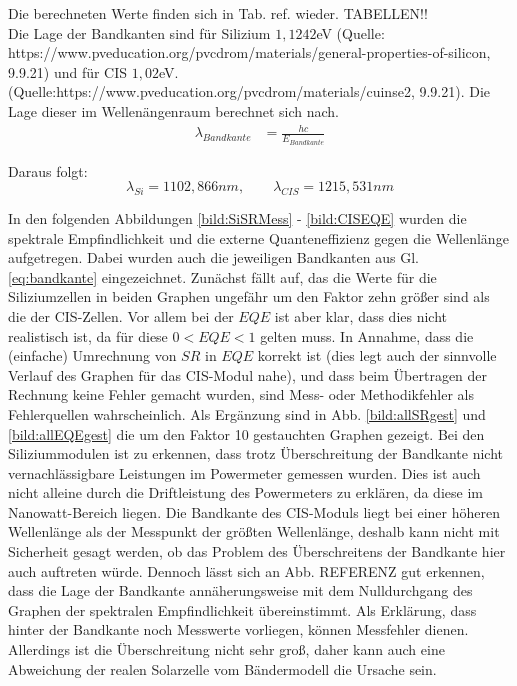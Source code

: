 Die berechneten Werte finden sich in Tab. ref. wieder. TABELLEN!!
\\

Die Lage der Bandkanten sind für Silizium $1,1242$eV (Quelle: https://www.pveducation.org/pvcdrom/materials/general-properties-of-silicon, 9.9.21) und für CIS $1,02$eV. (Quelle:https://www.pveducation.org/pvcdrom/materials/cuinse2, 9.9.21). Die Lage dieser im Wellenängenraum berechnet sich nach. \\

\begin{align}
\lambda_{Bandkante} &= \frac{hc}{E_{Bandkante}}
\end{align}

Daraus folgt: \\

\begin{equation}
\lambda_{Si} = 1102,866 nm, \qquad \lambda_{CIS} = 1215,531 nm
\label{eq:bandkante}
\end{equation}

In den folgenden Abbildungen \ref{bild:SiSRMess} - \ref{bild:CISEQE} wurden die spektrale Empfindlichkeit und die externe Quanteneffizienz gegen die Wellenlänge aufgetregen.
Dabei wurden auch die jeweiligen Bandkanten aus Gl. \ref{eq:bandkante} eingezeichnet.
Zunächst fällt auf, das die Werte für die Siliziumzellen in beiden Graphen ungefähr um den Faktor zehn größer sind als die der 
CIS-Zellen. Vor allem bei der $EQE$ ist aber klar, dass dies nicht realistisch ist, da für diese $0 < EQE < 1$ gelten muss.
In Annahme, dass die (einfache) Umrechnung von $SR$ in $EQE$ korrekt ist (dies legt auch der sinnvolle Verlauf des Graphen für 
das CIS-Modul nahe), und dass beim Übertragen der Rechnung keine Fehler gemacht wurden, sind Mess- oder Methodikfehler als Fehlerquellen
wahrscheinlich. Als Ergänzung sind in Abb. \ref{bild:allSRgest} und \ref{bild:allEQEgest} die um den Faktor 10 gestauchten Graphen gezeigt.
 Bei den Siliziummodulen ist zu erkennen, dass trotz 
Überschreitung der Bandkante nicht vernachlässigbare Leistungen im Powermeter gemessen wurden. Dies ist auch nicht alleine durch die 
Driftleistung des Powermeters zu erklären, da diese im Nanowatt-Bereich liegen. 
Die Bandkante des CIS-Moduls liegt bei einer höheren Wellenlänge als der Messpunkt der größten Wellenlänge, deshalb kann nicht mit 
Sicherheit gesagt werden, ob das Problem des Überschreitens der Bandkante hier auch auftreten würde. Dennoch lässt sich an Abb. 
REFERENZ gut erkennen, dass die Lage der Bandkante annäherungsweise mit dem Nulldurchgang des Graphen der spektralen Empfindlichkeit
übereinstimmt. Als Erklärung, dass hinter der Bandkante noch Messwerte vorliegen, können Messfehler dienen. Allerdings ist die 
Überschreitung nicht sehr groß, daher kann auch eine Abweichung der realen Solarzelle vom Bändermodell die Ursache sein. \\

